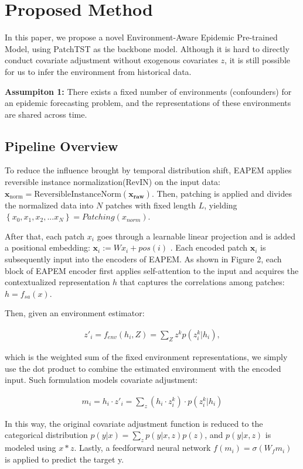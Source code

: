 \section{Proposed Method}
In this paper, we propose a novel Environment-Aware Epidemic Pre-trained Model, using PatchTST as the backbone model. Although it is hard to directly conduct covariate adjustment without exogenous covariates $z$, it is still possible for us to infer the environment from historical data.

\textbf{Assumpiton 1:}
There exists a fixed number of environments (confounders) for an epidemic forecasting problem, and the representations of these environments are shared across time.

\subsection{Pipeline Overview}
To reduce the influence brought by temporal distribution shift, EAPEM applies reversible
instance normalization(RevIN) on the input data: $\mathbf{x}_{\text{norm}} = \text{ReversibleInstanceNorm}(\mathbf{x_{raw}})$. Then, patching is applied and divides the normalized data into $N$ patches with fixed length $L$, yielding $\left\{ x_0, x_1, x_2, ...x_N \right\} = Patching(x_{norm})$.

After that, each patch $x_i$ goes through a learnable linear projection and is added a positional embedding:
$
    \mathbf{x}_i := W x_i + pos(i)
$
. Each encoded patch \( \mathbf{x}_i \) is subsequently input into the encoders of EAPEM. As shown in Figure 2, each block of EAPEM encoder first applies self-attention to the input and acquires the contextualized representation $h$ that captures the correlations among patches: $h=f_{sa}(x)$.

Then, given an environment estimator:

\begin{align}
    z'_i=f_{env}(h_i, Z) = \sum_Z z^kp(z^k_i|h_i) ,
\end{align}

which is the weighted sum of the fixed environment representations, we simply use the dot product to combine the estimated environment with the encoded input. Such formulation models covariate adjustment:

\begin{align}
    m_i=h_i \cdot z'_i=\sum_z (h_i \cdot z_i^k) \cdot p(z_i^k|h_i) \tag{2}
\end{align}

In this way, the original covariate adjustment function is reduced to the categorical distribution $p(y | x) = \sum_z p(y | x, z) p(z)$, and $p(y|x,z)$ is modeled using $x*z$. Lastly, a feedforward neural network $f(m_i)=\sigma(W_f m_i)$ is applied to predict the target y.


